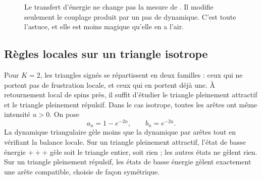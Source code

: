 \begin{figure}[H]
\centering
{}
\caption{Le transfert d'énergie ne change pas la mesure de . Il modifie seulement le couplage produit par un pas de dynamique. C'est toute l'astuce, et elle est moins magique qu'elle en a l'air.}
\label{fig:chapII_transfer_energy}
\end{figure}

\subsection{Règles locales sur un triangle isotrope}

Pour $K=2$, les triangles signés se répartissent en deux familles : ceux qui ne portent pas de frustration locale, et ceux qui en portent déjà une. À retournement local de spins près, il suffit d'étudier le triangle pleinement attractif et le triangle pleinement répulsif. Dans le cas isotrope, toutes les arêtes ont même intensité $u>0$. On pose
\begin{equation}
    a_u=1-e^{-2u},
    \qquad
    b_u=e^{-2u}.
    \label{eq:chapII_triangle_ab}
\end{equation}
La dynamique triangulaire gèle moins que la dynamique par arêtes tout en vérifiant la balance locale. Sur un triangle pleinement attractif, l'état de basse énergie $+++$ gèle soit le triangle entier, soit rien ; les autres états ne gèlent rien. Sur un triangle pleinement répulsif, les états de basse énergie gèlent exactement une arête compatible, choisie de façon symétrique.

